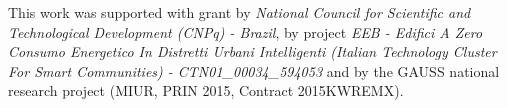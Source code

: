 \documentclass[format=acmsmall, review=false, screen=false]{acmart}
\begin{document}
%	
%	
%	
%	
%	  
	
	\begin{acks}
	
	This work was supported with grant by \textit{National Council for Scientific and Technological Development (CNPq) - Brazil},  by project \textit{EEB - Edifici A Zero Consumo Energetico In Distretti Urbani Intelligenti (Italian Technology Cluster For Smart Communities) - CTN01\_00034\_594053} and by the GAUSS national research project (MIUR, PRIN 2015, Contract 2015KWREMX).
	
	\end{acks}
	
	
	
	
\end{document}
